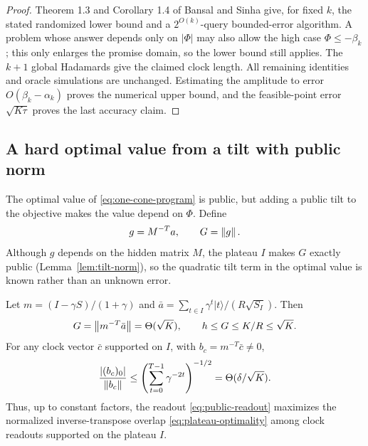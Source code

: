 \begin{proof}
Theorem 1.3 and Corollary 1.4 of Bansal and Sinha
\citep{BansalSinha2021} give, for fixed $k$, the stated randomized
lower bound and a $2^{O(k)}$-query bounded-error algorithm.  A problem whose
answer depends only on $|\Phi|$ may also allow the high case
$\Phi\leq-\beta_k$; this only enlarges the promise domain, so the lower
bound still applies.  The $k+1$ global Hadamards give
the claimed clock length.  All remaining identities and oracle
simulations are unchanged.  Estimating the amplitude to error
$O(\beta_k-\alpha_k)$ proves the numerical upper bound, and the
feasible-point error $\sqrt{K\tau}$ proves the last accuracy claim.
\end{proof}

\subsection{A hard optimal value from a tilt with public norm}

The optimal value of \eqref{eq:one-cone-program} is public, but adding a
public tilt to the objective makes the value depend on $\Phi$.  Define
\[
 g=M^{-T}a,\qquad G=\left\lVert g\right\rVert.
\]
Although $g$ depends on the hidden matrix $M$, the plateau $I$ makes
$G$ exactly public (Lemma~\ref{lem:tilt-norm}), so the quadratic tilt
term in the optimal value is known rather than an unknown error.

\begin{lemma}\label{lem:tilt-norm}
Let $m=(I-\gamma S)/(1+\gamma)$ and
$\bar a=\sum_{t\in I}\gamma^t|t\rangle/(R\sqrt{S_I})$.
Then
\begin{equation}\label{eq:public-G}
 G=\left\lVert m^{-T}\bar a\right\rVert=\Theta(\sqrt K),\qquad
 h\leq G\leq K/R\leq\sqrt K.
\end{equation}
For any clock vector $\bar c$ supported on $I$, with
$b_c=m^{-T}\bar c\ne0$,
\begin{equation}\label{eq:plateau-optimality}
 \frac{|(b_c)_0|}{\left\lVert b_c\right\rVert}
 \leq\left(\sum_{t=0}^{T-1}\gamma^{-2t}\right)^{-1/2}
 =\Theta(\delta/\sqrt K).
\end{equation}
Thus, up to constant factors, the readout \eqref{eq:public-readout}
maximizes the normalized inverse-transpose overlap
\eqref{eq:plateau-optimality} among clock readouts supported on the
plateau $I$.
\end{lemma}

